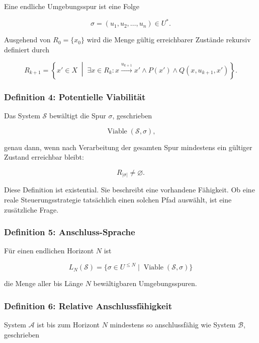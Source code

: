 \documentclass[
  10pt,
  a4paper,
]{article}
\begin{document}
Eine endliche Umgebungsspur ist eine Folge

\[
\sigma=(u_1,u_2,\ldots,u_n)\in U^*.
\]

Ausgehend von \(R_0=\{x_0\}\) wird die Menge gültig erreichbarer
Zustände rekursiv definiert durch

\[
R_{k+1}
=
\left\{
x'\in X
\;\middle|\;
\exists x\in R_k:
x\xrightarrow{u_{k+1}}x'
\land P(x')
\land Q(x,u_{k+1},x')
\right\}.
\]

\hypertarget{definition-4-potentielle-viabilituxe4t}{%
\subsubsection{Definition 4: Potentielle
Viabilität}\label{definition-4-potentielle-viabilituxe4t}}

Das System \(\mathcal S\) bewältigt die Spur \(\sigma\), geschrieben

\[
\operatorname{Viable}(\mathcal S,\sigma),
\]

genau dann, wenn nach Verarbeitung der gesamten Spur mindestens ein
gültiger Zustand erreichbar bleibt:

\[
R_{|\sigma|}\neq\varnothing.
\]

Diese Definition ist existential. Sie beschreibt eine vorhandene
Fähigkeit. Ob eine reale Steuerungsstrategie tatsächlich einen solchen
Pfad auswählt, ist eine zusätzliche Frage.

\hypertarget{definition-5-anschluss-sprache}{%
\subsubsection{Definition 5:
Anschluss-Sprache}\label{definition-5-anschluss-sprache}}

Für einen endlichen Horizont \(N\) ist

\[
L_N(\mathcal S)
=
\{\sigma\in U^{\le N}\mid
\operatorname{Viable}(\mathcal S,\sigma)\}
\]

die Menge aller bis Länge \(N\) bewältigbaren Umgebungsspuren.

\hypertarget{definition-6-relative-anschlussfuxe4higkeit}{%
\subsubsection{Definition 6: Relative
Anschlussfähigkeit}\label{definition-6-relative-anschlussfuxe4higkeit}}

System \(\mathcal A\) ist bis zum Horizont \(N\) mindestens so
anschlussfähig wie System \(\mathcal B\), geschrieben
\end{document}
